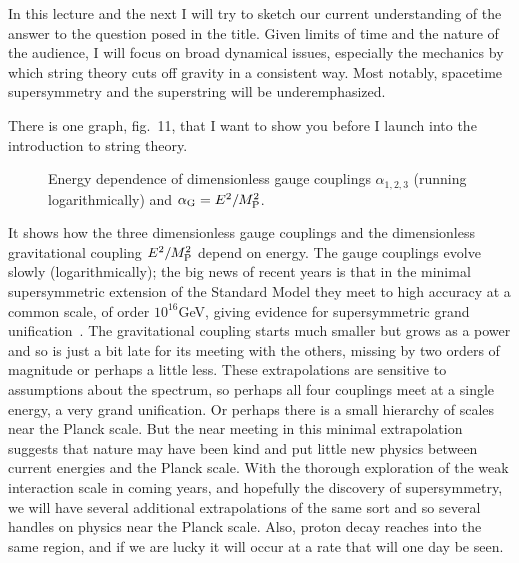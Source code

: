 In this lecture and the next I will try to sketch our current
understanding of the answer to the question posed in the title.
Given limits of time and the nature of the audience, 
I will focus on broad dynamical issues, especially the mechanics by
which string theory cuts off gravity in a consistent way.
Most notably,
spacetime supersymmetry and the superstring will be underemphasized.

There is one graph, fig.~11, that I want to show you before I launch
into the introduction to string theory.
\begin{figure}
\begin{center}
\leavevmode
{}
\end{center}
\caption[]{Energy dependence of dimensionless gauge couplings 
$\alpha_{1,2,3}$ (running logarithmically) and $\alpha_{\rm G}
= E^2 / M_{\rm P}^2$.}
\end{figure}
It shows how the three
dimensionless gauge couplings and the dimensionless gravitational
coupling $E^2 / M_{\rm P}^2$ depend on energy.  The gauge couplings
evolve slowly (logarithmically); the big news of recent years is
that in the minimal supersymmetric extension of the Standard Model
they meet to high accuracy at a common scale, of order $10^{16}$GeV,
giving evidence for supersymmetric grand unification~\cite{AdBF}.
The gravitational coupling starts much smaller but grows as a power
and so is just a bit late for its meeting with the others,
missing by two orders of magnitude or perhaps a little less.  These
extrapolations are sensitive to assumptions about the spectrum, so
perhaps all four couplings meet at a single energy, a very
grand unification.  Or perhaps there is a small hierarchy of scales
near the Planck scale.  But the near meeting in this minimal
extrapolation suggests that nature may have been kind and put
little new physics between current energies and the Planck scale.
With the thorough exploration of the weak interaction scale in
coming years, and hopefully the discovery of supersymmetry, we will
have several additional extrapolations of the same sort and so
several handles on physics near the Planck scale.  Also, proton
decay reaches into the same region, and if we are lucky it will
occur at a rate that will one day be seen.


